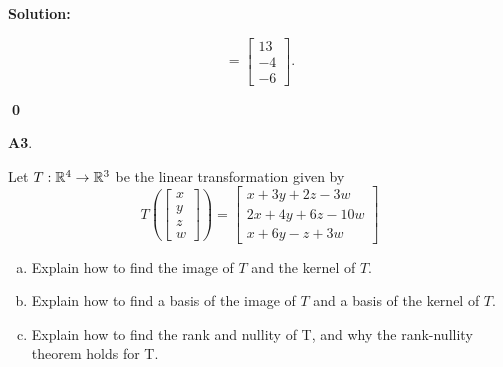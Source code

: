 \documentclass{article}
\newenvironment{problem}[1]
{
  \begin{flushleft}
  \textbf{#1}.
  \ignorespaces
}
{
  \end{flushleft}
}
\newenvironment{solution}
{
  \ignorespaces
  \textbf{Solution:}
}
{
  \ignorespacesafterend
  \begin{flushright}
  {\bfseries \qed}
  \end{flushright}
}
\begin{document}
\begin{solution}
\begin{enumerate}[(a)]
\[= \begin{bmatrix} 13 \\ -4 \\ -6\end{bmatrix}. \]
\end{enumerate}
\end{solution}

\begin{problem}{A3}
Let \(T: \mathbb{R}^4 \rightarrow \mathbb{R}^3\) be the linear transformation given by
\[
  T\left(\begin{bmatrix}x\\y\\z\\w\end{bmatrix} \right) =
  \begin{bmatrix}
    x+3y+2z-3w \\
    2x+4y+6z-10w \\
    x+6y-z+3w
  \end{bmatrix}
\]
\begin{enumerate}[(a)]
\item Explain how to find the image of \(T\) and the kernel of \(T\). 
\item Explain how to find a basis of the image of \(T\) and a basis of the kernel of \(T\). 
\item Explain how to find the rank and nullity of T, and why the rank-nullity theorem holds for T.
\end{enumerate}
\end{problem}
\end{document}
